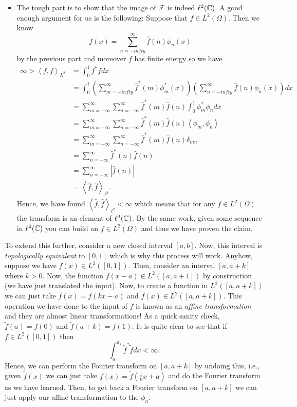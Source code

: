 \documentclass[12pt]{article} %
\newcommand{\innprod}[2]{\left\langle #1, #2\right\rangle}
\begin{document}
\begin{solution}
\begin{itemize}
\item The tough part is to show that the image of $\mathcal{F}$ is indeed $\ell^2(\mathbb{C})$. A good enough argument for us is the following: Suppose that $f\in L^2(\Omega)$. Then we know 
\[
f(x) = \sum_{n=-infty}^\infty \hat{f}(n) \phi_n(x)
\]
by the previous part and moreover $f$ has finite energy so we have
\begin{align*}
\infty > \innprod{f}{f}_{L^2} &= \int_0^1 f^* f dx \\
&= \int_0^1 \left(\sum_{m=-infty}^\infty \hat{f}^*(m) \phi_m^*(x)\right) \left(\sum_{n=-infty}^\infty \hat{f}(n) \phi_n(x)\right) dx\\
&= \sum_{m=-\infty}^\infty \sum_{n=-\infty}^\infty \hat{f}^*(m)\hat{f}(n) \int_0^1 \phi_m^* \phi_n dx\\
&= \sum_{m=-\infty}^\infty \sum_{n=-\infty}^\infty \hat{f}^*(m)\hat{f}(n) \innprod{\phi_m}{\phi_n}\\
&= \sum_{m=-\infty}^\infty \sum_{n=-\infty}^\infty \hat{f}^*(m)\hat{f}(n) \delta_{mn}\\
&= \sum_{n=-\infty}^\infty \hat{f}^*(n)\hat{f}(n)\\
&= \sum_{n=-\infty}^\infty |\hat{f}(n)|\\
&= \innprod{\hat{f}}{\hat{f}}_{\ell^2}.
\end{align*}
Hence, we have found $\innprod{\hat{f}}{\hat{f}}_{\ell^2} < \infty$ which means that for any $f\in L^2(\Omega)$ the transform is an element of $\ell^2(\mathbb{C})$. By the same work, given some sequence in $\ell^2(\mathbb{C})$ you can build an $f \in L^2(\Omega)$ and thus we have proven the claim.
\end{itemize}

To extend this further, consider a new closed interval $[a,b]$. Now, this interval is \emph{topologically equivalent} to $[0,1]$ which is why this process will work. Anyhow, suppose we have $f(x)\in L^2([0,1])$. Then, consider an interval $[a,a+k]$ where $k>0$. Now, the function $f(x-a)\in L^2([a,a+1])$ by construction (we have just translated the input). Now, to create a function in $L^2([a,a+k])$ we can just take $\tilde{f}(x)=f(kx-a)$ and $\tilde{f}(x)\in L^2([a,a+k])$. This operation we have done to the input of $f$ is known as an \emph{affine transformation} and they are almost linear transformations! As a quick sanity check, $\tilde{f}(a)=f(0)$ and $\tilde{f}(a+k)= f(1)$. It is quite clear to see that if $f\in L^2([0,1])$ then
\[
\int_a^{a_k} \tilde{f}^* \tilde{f} dx < \infty.
\]
Hence, we can perform the Fourier transform on $[a,a+k]$ by undoing this, i.e., given $\tilde{f}(x)$ we can just take $f(x) = \tilde{f}(\frac{1}{k}x +a)$ and do the Fourier transform as we have learned. Then, to get back a Fourier transform on $[a,a+k]$ we can just apply our affine transformation to the $\phi_n$.
\end{solution}
\end{document}
